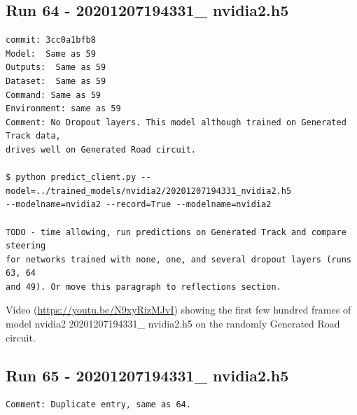 \subsection{Run 64 - 20201207194331\_ nvidia2.h5}
\label{app_res:64}
\begin{verbatim}
commit: 3cc0a1bfb8
Model:  Same as 59
Outputs:  Same as 59
Dataset:  Same as 59
Command: Same as 59
Environment: same as 59 
Comment: No Dropout layers. This model although trained on Generated Track data,
drives well on Generated Road circuit.

$ python predict_client.py --model=../trained_models/nvidia2/20201207194331_nvidia2.h5
--modelname=nvidia2 --record=True --modelname=nvidia2

TODO - time allowing, run predictions on Generated Track and compare steering
for networks trained with none, one, and several dropout layers (runs 63, 64
and 49). Or move this paragraph to reflections section.
\end{verbatim}
Video (\url{https://youtu.be/N9xyRizMJvI}) showing the first few hundred frames of model  
nvidia2 20201207194331\_ nvidia2.h5 on the randomly Generated Road circuit.


\subsection{Run 65 - 20201207194331\_ nvidia2.h5 }
\label{app_res:65}
\begin{verbatim}
Comment: Duplicate entry, same as 64.
\end{verbatim}

